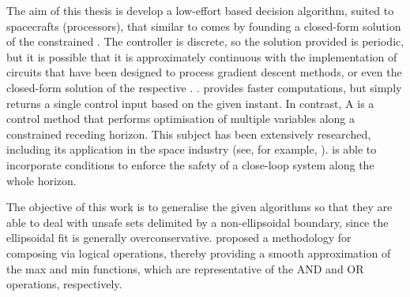 The aim of this thesis is develop a low-effort  based decision algorithm, suited to spacecrafts (processors), that similar to \cite{matias2025hybrid, reis2020control} comes by founding a closed-form solution of the constrained . The controller is discrete, so the solution provided is periodic, but it is possible that it is approximately continuous with the implementation of circuits that have been designed to process gradient descent methods, or even the closed-form solution of the respective . \cite{hao2025analysis}.
 provides faster computations, but simply returns a single control input based on the given instant. In contrast, A  is a control method that performs optimisation of multiple variables along a constrained receding horizon. This subject has been extensively researched, including its application in the space industry (see, for example, \cite{hartley2015tutorial, kaczmarek2023autonomous}).  is able to incorporate  conditions to enforce the safety of a close-loop system \cite{grandia2021multi} along the whole horizon.

The objective of this work is to generalise the given algorithms so that they are able to deal with unsafe sets delimited by a non-ellipsoidal boundary, since the ellipsoidal fit is generally overconservative. \cite{molnar2023composing}  proposed a methodology for composing  via logical operations, thereby  providing a smooth approximation of the max and min functions, which are representative of the AND and OR operations, respectively.  

